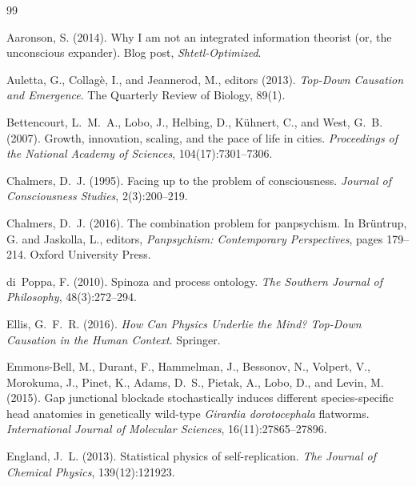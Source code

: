 \documentclass[12pt,a4paper]{article}
\begin{document}
\begin{thebibliography}{99}

Aaronson, S. (2014).
\newblock Why I am not an integrated information theorist (or, the
  unconscious expander).
\newblock Blog post, \emph{Shtetl-Optimized}.

Auletta, G., Collag\`{e}, I., and Jeannerod, M., editors (2013).
\newblock \emph{Top-Down Causation and Emergence}.
\newblock The Quarterly Review of Biology, 89(1).

Bettencourt, L.~M.~A., Lobo, J., Helbing, D., K\"{u}hnert, C., and
  West, G.~B. (2007).
\newblock Growth, innovation, scaling, and the pace of life in cities.
\newblock \emph{Proceedings of the National Academy of Sciences},
  104(17):7301--7306.

Chalmers, D.~J. (1995).
\newblock Facing up to the problem of consciousness.
\newblock \emph{Journal of Consciousness Studies}, 2(3):200--219.

Chalmers, D.~J. (2016).
\newblock The combination problem for panpsychism.
\newblock In Br\"{u}ntrup, G. and Jaskolla, L., editors, \emph{Panpsychism:
  Contemporary Perspectives}, pages 179--214. Oxford University Press.

di~Poppa, F. (2010).
\newblock Spinoza and process ontology.
\newblock \emph{The Southern Journal of Philosophy}, 48(3):272--294.

Ellis, G.~F.~R. (2016).
\newblock \emph{How Can Physics Underlie the Mind? Top-Down Causation in
  the Human Context}.
\newblock Springer.

Emmons-Bell, M., Durant, F., Hammelman, J., Bessonov, N., Volpert, V.,
  Morokuma, J., Pinet, K., Adams, D.~S., Pietak, A., Lobo, D., and
  Levin, M. (2015).
\newblock Gap junctional blockade stochastically induces different
  species-specific head anatomies in genetically wild-type
  \emph{Girardia dorotocephala} flatworms.
\newblock \emph{International Journal of Molecular Sciences},
  16(11):27865--27896.

England, J.~L. (2013).
\newblock Statistical physics of self-replication.
\newblock \emph{The Journal of Chemical Physics}, 139(12):121923.


\end{thebibliography}
\end{document}
